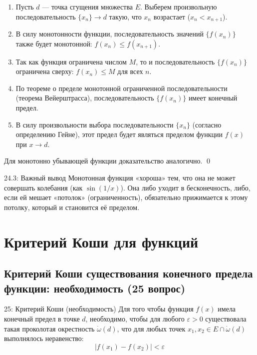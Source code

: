 \documentclass[a4paper,12pt]{article}
\begin{document}
	\begin{enumerate}
		\item Пусть $d$ — точка сгущения множества $E$. Выберем произвольную последовательность $\{x_n\} \to d$ такую, что $x_n$ возрастает ($x_n < x_{n+1}$).
		\item В силу монотонности функции, последовательность значений $\{f(x_n)\}$ также будет монотонной: $f(x_n) \le f(x_{n+1})$.
		\item Так как функция ограничена числом $M$, то и последовательность $\{f(x_n)\}$ ограничена сверху: $f(x_n) \le M$ для всех $n$.
		\item По теореме о пределе монотонной ограниченной последовательности (теорема Вейерштрасса), последовательность $\{f(x_n)\}$ имеет конечный предел.
		\item В силу произвольности выбора последовательности $\{x_n\}$ (согласно определению Гейне), этот предел будет являться пределом функции $f(x)$ при $x \to d$.
	\end{enumerate}
	
	Для монотонно убывающей функции доказательство аналогично. \qed
	
	\begin{notebook}{24.3: Важный вывод}
		Монотонная функция «хороша» тем, что она не может совершать колебания (как $\sin(1/x)$). Она либо уходит в бесконечность, либо, если ей мешает «потолок» (ограниченность), обязательно прижимается к этому потолку, который и становится её пределом.
	\end{notebook}
	
	
	
	
	
	
	\newpage
	\section{Критерий Коши для функций}
	
	\subsection{Критерий Коши существования конечного предела функции: необходимость (25 вопрос)}
	
	\begin{theorembox}{25: Критерий Коши (необходимость)}
		Для того чтобы функция $f(x)$ имела конечный предел в точке $d$, необходимо, чтобы для любого $\varepsilon > 0$ существовала такая проколотая окрестность $\dot{\omega}(d)$, что для любых точек $x_1, x_2 \in E \cap \dot{\omega}(d)$ выполнялось неравенство:
		\[ |f(x_1) - f(x_2)| < \varepsilon \]
	\end{theorembox}
	
\end{document}
